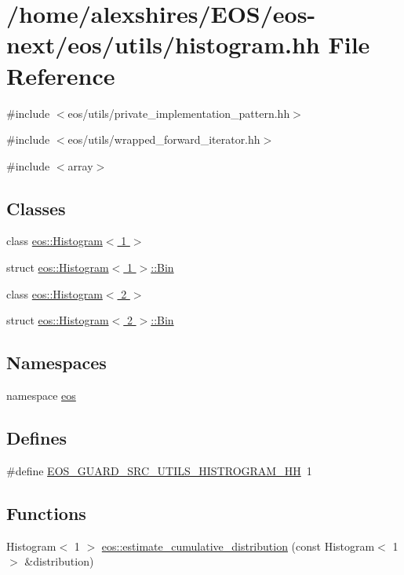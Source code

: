 \hypertarget{histogram_8hh}{
\section{/home/alexshires/EOS/eos-\/next/eos/utils/histogram.hh File Reference}
\label{histogram_8hh}
}
{\ttfamily \#include $<$eos/utils/private\_\-implementation\_\-pattern.hh$>$}\par
{\ttfamily \#include $<$eos/utils/wrapped\_\-forward\_\-iterator.hh$>$}\par
{\ttfamily \#include $<$array$>$}\par
\subsection*{Classes}
\begin{DoxyCompactItemize}
\item 
class \hyperlink{classeos_1_1Histogram_3_011_01_4}{eos::Histogram$<$ 1 $>$}
\item 
struct \hyperlink{structeos_1_1Histogram_3_011_01_4_1_1Bin}{eos::Histogram$<$ 1 $>$::Bin}
\item 
class \hyperlink{classeos_1_1Histogram_3_012_01_4}{eos::Histogram$<$ 2 $>$}
\item 
struct \hyperlink{structeos_1_1Histogram_3_012_01_4_1_1Bin}{eos::Histogram$<$ 2 $>$::Bin}
\end{DoxyCompactItemize}
\subsection*{Namespaces}
\begin{DoxyCompactItemize}
\item 
namespace \hyperlink{namespaceeos}{eos}
\end{DoxyCompactItemize}
\subsection*{Defines}
\begin{DoxyCompactItemize}
\item 
\#define \hyperlink{histogram_8hh_afe875e5b706ab37171b07b2bcaf37b66}{EOS\_\-GUARD\_\-SRC\_\-UTILS\_\-HISTROGRAM\_\-HH}~1
\end{DoxyCompactItemize}
\subsection*{Functions}
\begin{DoxyCompactItemize}
\item 
Histogram$<$ 1 $>$ \hyperlink{namespaceeos_a163f4d3cb33f72cf2ffc42f8cee7db0e}{eos::estimate\_\-cumulative\_\-distribution} (const Histogram$<$ 1 $>$ \&distribution)
\end{DoxyCompactItemize}


